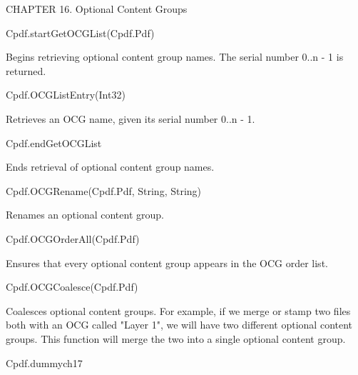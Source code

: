 CHAPTER 16. Optional Content Groups

Cpdf.startGetOCGList(Cpdf.Pdf)


Begins retrieving optional content group names. The serial number 0..n - 1
is returned.


Cpdf.OCGListEntry(Int32)


Retrieves an OCG name, given its serial number 0..n - 1.


Cpdf.endGetOCGList


Ends retrieval of optional content group names.


Cpdf.OCGRename(Cpdf.Pdf, String, String)


Renames an optional content group.


Cpdf.OCGOrderAll(Cpdf.Pdf)


Ensures that every optional content group appears in the OCG order list.


Cpdf.OCGCoalesce(Cpdf.Pdf)


Coalesces optional content groups. For example, if we merge or stamp two
files both with an OCG called "Layer 1", we will have two different optional
content groups. This function will merge the two into a single optional
content group.


Cpdf.dummych17

